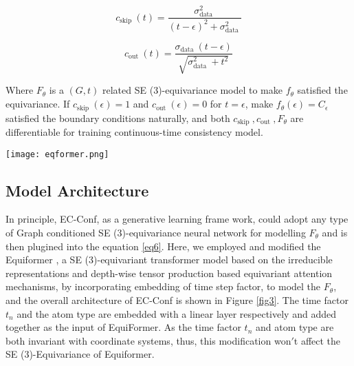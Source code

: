\documentclass{article} %
\begin{document}
\begin{equation}
	c_{\text {skip }}(t)=\frac{\sigma_{\text {data }}^2}{(t-\epsilon)^2+\sigma_{\text {data }}^2}
	\label{eq7}
\end{equation}

\begin{equation}
	c_{\text {out }}(t)=\frac{\sigma_{\text {data }}(t-\epsilon)}{\sqrt{\sigma_{\text {data }}^2+t^2}}
	\label{eq8}
\end{equation}

Where $F_\theta$ is a $(G, t)$ related SE (3)-equivariance model to make $f_\theta$ satisfied the equivariance. If $c_{\text {skip }}(\epsilon)=1$ and $c_{\text {out }}(\epsilon)=0$ for $t=\epsilon$, make $f_\theta(\epsilon)=C_\epsilon$ satisfied the boundary conditions naturally, and both $c_{\text {skip }}, c_{\text {out }}, F_\theta$ are differentiable for training continuous-time consistency model. 

\begin{figure*}[htbp]
	\centering
	\centerline{\texttt{[image: eqformer.png]}}
	\caption{The model architecture in EC-Conf.}
	\label{fig3}
\end{figure*}


\subsection{Model Architecture}
In principle, EC-Conf, as a generative learning frame work, could adopt any type of Graph conditioned SE (3)-equivariance neural network for modelling $F_\theta$ and is then plugined into the equation \ref{eq6}. Here, we employed and modified the Equiformer \cite{liao2022equiformer}, a SE (3)-equivariant transformer model based on the irreducible representations and depth-wise tensor production based equivariant attention mechanisms, by incorporating embedding of time step factor, to model the $F_\theta$, and the overall architecture of EC-Conf is shown in Figure \ref{fig3}. The time factor $t_n$ and the atom type are embedded with a linear layer respectively and added together as the input of EquiFormer. As the time factor $t_n$ and atom type are both invariant with coordinate systems, thus, this modification won$'$t affect the SE (3)-Equivariance of Equiformer. 
\end{document}
